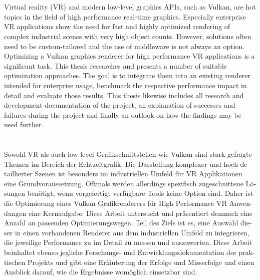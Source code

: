\chapter{\abstractname}

Virtual reality (\gls{VR}) and modern low-level graphics APIs, such as Vulkan, are hot topics in the field of high performance real-time graphics. Especially enterprise VR applications show the need for fast and highly optimized rendering of complex industrial scenes with very high object counts. However, solutions often need to be custom-tailored and the use of middleware is not always an option. Optimizing a Vulkan graphics renderer for high performance VR applications is a significant task. This thesis researches and presents a number of suitable optimization approaches. The goal is to integrate them into an existing renderer intended for enterprise usage, benchmark the respective performance impact in detail and evaluate those results. This thesis likewise includes all research and development documentation of the project, an explanation of successes and failures during the project and finally an outlook on how the findings may be used further.  





\makeatletter
{}
{\renewcommand{\abstractname}{Kurzfassung}}
{\renewcommand{\abstractname}{Abstract}}
\makeatother

\chapter{\abstractname}

\begin{otherlanguage}{ngerman} %
Sowohl \gls{VR} als auch low-level Grafikschnittstellen wie Vulkan sind stark gefragte Themen im Bereich der Echtzeitgrafik. Die Darstellung komplexer und hoch detaillierter Szenen ist besonders im industriellen Umfeld für VR Applikationen eine Grundvoraussetzung. Oftmals werden allerdings spezifisch zugeschnittene Lösungen benötigt, wenn vorgefertigt verfügbare Tools keine Option sind. Daher ist die Optimierung eines Vulkan Grafikrenderers für High Performance VR Anwendungen eine Kernaufgabe. Diese Arbeit untersucht und präsentiert demnach eine Anzahl an passenden Optimierungswegen. Teil des Ziels ist es, eine Auswahl dieser in einen vorhandenen Renderer aus dem industriellen Umfeld zu integrieren, die jeweilige Performance zu im Detail zu messen und auszuwerten. Diese Arbeit beinhaltet ebenso jegliche Forschungs- und Entwicklungsdokumentation des praktischen Projekts und gibt eine Erläuterung der Erfolge und Misserfolge und einen Ausblick darauf, wie die Ergebnisse womöglich einsetzbar sind. 
\end{otherlanguage}


\makeatletter
{}
{\renewcommand{\abstractname}{Abstract}}
{\renewcommand{\abstractname}{Kurzfassung}}
\makeatother